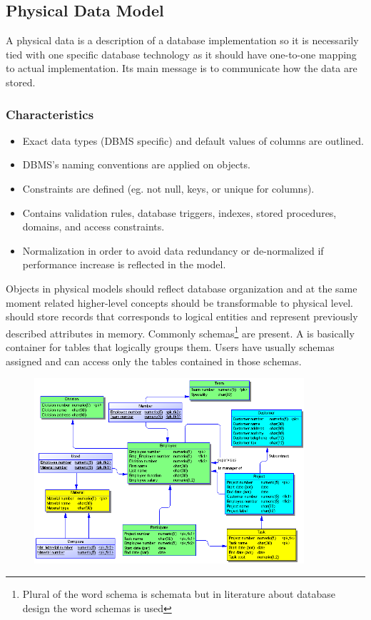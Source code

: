 \subsection{Physical Data Model}

A physical data is a description of a database implementation so it is necessarily tied with one specific database technology as it should have one-to-one mapping to actual implementation. Its main message is to communicate how the data are stored.

\subsubsection{Characteristics}
\begin{itemize}
	\item Exact data types (DBMS specific) and default values of columns are outlined.
	\item DBMS's naming conventions are applied on objects.
	\item Constraints are defined (eg. not null, keys, or unique for columns).
	\item Contains validation rules, database triggers, indexes, stored procedures, domains, and access constraints.
	\item Normalization in order to avoid data redundancy or de-normalized if performance increase is reflected in the model.
\end{itemize}

Objects in physical models should reflect database organization and at the same moment related higher-level concepts should be transformable to physical level.  should store records that corresponds to logical entities and  represent previously described attributes in memory.
Commonly schemas\footnote{Plural of the word schema is schemata but in literature about database design the word schemas is used} are present. A  is basically container for tables that logically groups them. Users have usually schemas assigned and can access only the tables contained in those schemas.

\begin{figure}[H]
	\centering
	\includegraphics[width=10cm]{../img/Physical_Model_PowerDesigner}
	\caption{\cite{PhysicalModelExample}}
\end{figure}

